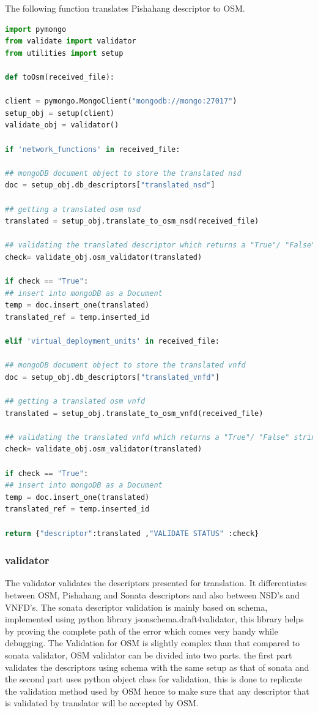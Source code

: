 \pagebreak

The following function translates Pishahang descriptor to OSM.
\begin{lstlisting}[language=Python,caption=Translating Pishahang descriptor to OSM, label=lis:toOSM]
import pymongo
from validate import validator
from utilities import setup

def toOsm(received_file):

client = pymongo.MongoClient("mongodb://mongo:27017")
setup_obj = setup(client)
validate_obj = validator()

if 'network_functions' in received_file:

## mongoDB document object to store the translated nsd
doc = setup_obj.db_descriptors["translated_nsd"]

## getting a translated osm nsd
translated = setup_obj.translate_to_osm_nsd(received_file)

## validating the translated descriptor which returns a "True"/ "False" string
check= validate_obj.osm_validator(translated)

if check == "True":
## insert into mongoDB as a Document
temp = doc.insert_one(translated)
translated_ref = temp.inserted_id

elif 'virtual_deployment_units' in received_file:

## mongoDB document object to store the translated vnfd
doc = setup_obj.db_descriptors["translated_vnfd"]

## getting a translated osm vnfd
translated = setup_obj.translate_to_osm_vnfd(received_file)

## validating the translated vnfd which returns a "True"/ "False" string
check= validate_obj.osm_validator(translated)

if check == "True":
## insert into mongoDB as a Document
temp = doc.insert_one(translated)
translated_ref = temp.inserted_id

return {"descriptor":translated ,"VALIDATE STATUS" :check}
\end{lstlisting}

\subsubsection{validator}

The validator validates the descriptors presented for translation. It differentiates between OSM, Pishahang and Sonata descriptors and also between NSD's and VNFD's. The sonata descriptor validation is mainly based on schema, implemented using python library jsonschema.draft4validator, this library helps by proving the complete path of the error which comes very handy while debugging. The Validation for OSM is slightly complex than that compared to sonata validator, OSM validator can be divided into two parts. the first part validates the descriptors using schema with the same setup as that of sonata and the second part uses python object class for validation, this is done to replicate the validation method used by OSM hence to make sure that any descriptor that is validated by translator will be accepted by OSM.

